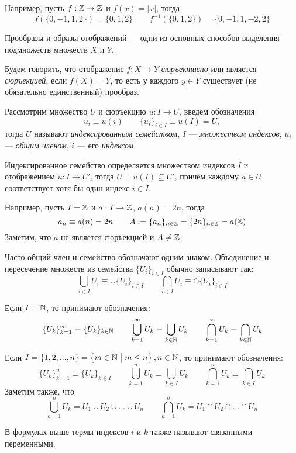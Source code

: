 Например, пусть $f:\mathbb Z\to\mathbb Z$ и $f(x)=|x|$, тогда
\[
  f(\{0,-1,1,2\})=\{0,1,2\}\qquad f^{-1}(\{0,1,2\})=\{0,-1,1,-2,2\}
\]

Прообразы и образы отображений --- одни из основных способов выделения
подмножеств множеств $X$ и $Y$.

Будем говорить, что отображение $f:X\to Y$ {\it сюръективно}
или является {\it сюръекцией}, если $f(X)=Y$,
то есть у каждого $y\in Y$ существует (не обязательно единственный) прообраз.

Рассмотрим множество $U$ и сюръекцию ${u:I\to U}$,
введём обозначения
\[
  u_{i}\equiv u(i)\qquad \{u_{i}\}_{i\in I}\equiv u(I)=U,
\]
тогда $U$ называют {\it индексированным семейством},
$I$ --- {\it множеством индексов},
$u_{i}$ --- {\it общим членом},
$i$ --- его {\it индексом}.

Индексированное семейство определяется множеством индексов $I$ и отображением
${u:I\to U'}$, тогда $U=u(I)\subseteq U'$,
причём каждому $a\in U$ соответствует хотя бы один индекс $i\in I$.

Например, пусть $I=\mathbb Z$ и $a:I\to \mathbb Z$, $a(n)=2n$, тогда
\[
  a_{n}\equiv a(n)=2n\qquad A:=\{a_{n}\}_{n\in\mathbb Z}=\{2n\}_{n\in\mathbb Z}=a(\mathbb Z)
\]
Заметим, что $a$ не является сюръекцией и $A\neq \mathbb Z$.

Часто общий член и семейство обозначают одним знаком.
Объединение и пересечение множеств из семейства $\{U_{i}\}_{i\in I}$
обычно записывают так:
\[
  \bigcup_{i\in I}U_{i}\equiv\cup \{U_{i}\}_{i\in I}\qquad
  \bigcap_{i\in I}U_{i}\equiv\cap \{U_{i}\}_{i\in I}
\]

Если $I=\mathbb N$, то принимают обозначения:
\[
  \{U_{k}\}_{k=1}^{\infty}\equiv\{U_{k}\}_{k\in\mathbb N}\qquad
  \bigcup_{k=1}^{\infty}U_{k}\equiv\bigcup_{k\in\mathbb N}U_{k}\qquad
  \bigcap_{k=1}^{\infty}U_{k}\equiv\bigcap_{k\in\mathbb N}U_{k}
\]

Если $I=\{1,2,...,n\}=\left\{m\in\mathbb N\;\big|\;m\leq n\right\},n\in\mathbb N$,
то принимают обозначения:
\[
  \{U_{k}\}_{k=1}^{n}\equiv\{U_{k}\}_{k\in I}\qquad
  \bigcup_{k=1}^{n}U_{k}\equiv\bigcup_{k\in I}U_{k}\qquad
  \bigcap_{k=1}^{n}U_{k}\equiv\bigcap_{k\in I}U_{k}
\]
Заметим также, что
\[
  \bigcup_{k=1}^{n}U_{k}=U_1\cup U_2\cup ...\cup U_{n}\qquad
  \bigcap_{k=1}^{n}U_{k}=U_1\cap U_2\cap ...\cap U_{n}
\]

В формулах выше термы индексов $i$ и $k$ также называют связанными переменными.

